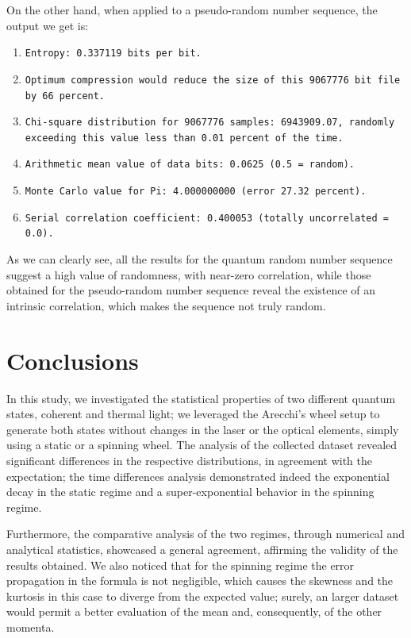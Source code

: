\documentclass[prl,twocolumn]{revtex4-1}
\begin{document}
On the other hand, when applied to a pseudo-random number sequence, the output we get is:
\begin{enumerate}
    \item \texttt{Entropy: 0.337119 bits per bit.}
    \item \texttt{Optimum compression would reduce the size of this 9067776 bit file by 66 percent.}
    \item \texttt{Chi-square distribution for 9067776 samples: 6943909.07, randomly exceeding this value less than 0.01 percent of the time.}
    \item \texttt{Arithmetic mean value of data bits: 0.0625 (0.5 = random).}
    \item \texttt{Monte Carlo value for Pi: 4.000000000 (error 27.32 percent).}
    \item \texttt{Serial correlation coefficient: 0.400053 (totally uncorrelated = 0.0).}
\end{enumerate}

As we can clearly see, all the results for the quantum random number sequence suggest a high value of randomness, with near-zero correlation, while those obtained for the pseudo-random number sequence reveal the existence of an intrinsic correlation, which makes the sequence not truly random.

\section{Conclusions}
In this study, we investigated the statistical properties of two different quantum states, coherent and thermal light; we leveraged the Arecchi's wheel setup to generate both states without changes in the laser or the optical elements, simply using a static or a spinning wheel. The analysis of the collected dataset revealed significant differences in the respective distributions, in agreement with the expectation; the time differences analysis demonstrated indeed the exponential decay in the static regime and a super-exponential behavior in the spinning regime.

Furthermore, the comparative analysis of the two regimes, through numerical and analytical statistics, showcased a general agreement, affirming the validity of the results obtained. We also noticed that for the spinning regime the error propagation in the formula is not negligible, which causes the skewness and the kurtosis in this case to diverge from the expected value; surely, an larger dataset would permit a better evaluation of the mean and, consequently, of the other momenta.
\end{document}
